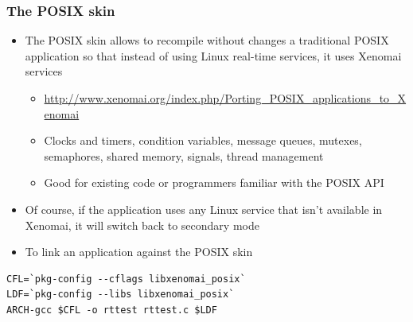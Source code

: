 \begin{frame}[fragile]
  \frametitle{The POSIX skin}
  \begin{itemize}
  \item The POSIX skin allows to recompile without changes a
    traditional POSIX application so that instead of using Linux
    real-time services, it uses Xenomai services
    \begin{itemize}
    \item {\small
      \url{http://www.xenomai.org/index.php/Porting_POSIX_applications_to_Xenomai}}
    \item Clocks and timers, condition variables, message queues,
      mutexes, semaphores, shared memory, signals, thread management
    \item Good for existing code or programmers familiar with the
      POSIX API
    \end{itemize}
  \item Of course, if the application uses any Linux service that
    isn't available in Xenomai, it will switch back to secondary mode
  \item To link an application against the POSIX skin
  \end{itemize}
  \begin{block}{}
\small
\begin{verbatim}
CFL=`pkg-config --cflags libxenomai_posix`
LDF=`pkg-config --libs libxenomai_posix`
ARCH-gcc $CFL -o rttest rttest.c $LDF
\end{verbatim}
\normalsize
\end{block}
\end{frame}


